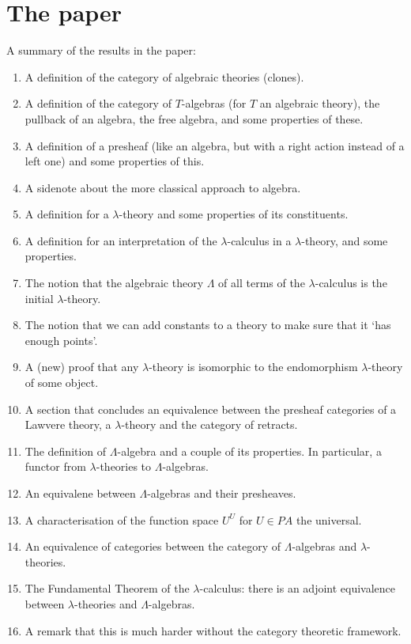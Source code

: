 \documentclass{amsbook}
\theoremstyle{definition}
\begin{document}
  \section{The paper}
  A summary of the results in the paper:
  \begin{enumerate}
    \item A definition of the category of algebraic theories (clones).
    \item A definition of the category of $ T $-algebras (for $ T $ an algebraic theory), the pullback of an algebra, the free algebra, and some properties of these.
    \item A definition of a presheaf (like an algebra, but with a right action instead of a left one) and some properties of this.
    \item A sidenote about the more classical approach to algebra.
    \item A definition for a $ \lambda $-theory and some properties of its constituents.
    \item A definition for an interpretation of the $ \lambda $-calculus in a $ \lambda $-theory, and some properties.
    \item The notion that the algebraic theory $ \Lambda $ of all terms of the $ \lambda $-calculus is the initial $ \lambda $-theory.
    \item The notion that we can add constants to a theory to make sure that it `has enough points'.
    \item A (new) proof that any $ \lambda $-theory is isomorphic to the endomorphism $ \lambda $-theory of some object.
    \item A section that concludes an equivalence between the presheaf categories of a Lawvere theory, a $ \lambda $-theory and the category of retracts.
    \item The definition of $ \Lambda $-algebra and a couple of its properties. In particular, a functor from $ \lambda $-theories to $ \Lambda $-algebras.
    \item An equivalene between $ \Lambda $-algebras and their presheaves.
    \item A characterisation of the function space $ U^U $ for $ U \in PA $ the universal.
    \item An equivalence of categories between the category of $ \Lambda $-algebras and $ \lambda $-theories.
    \item The Fundamental Theorem of the $ \lambda $-calculus: there is an adjoint equivalence between $ \lambda $-theories and $ \Lambda $-algebras.
    \item A remark that this is much harder without the category theoretic framework.
  \end{enumerate}
\end{document}
